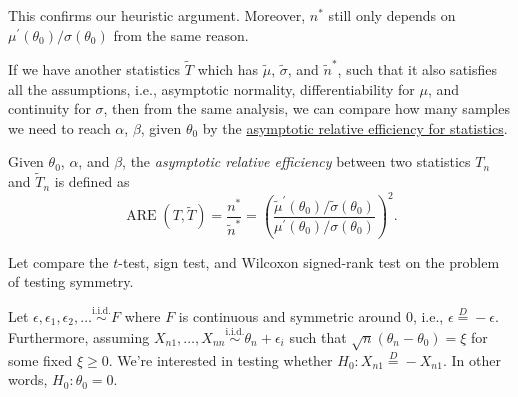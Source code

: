 \begin{remark}
	This confirms our heuristic argument. Moreover, \(n^{\ast} \) still only depends on \(\mu ^{\prime} (\theta _0) / \sigma (\theta _0)\) from the same reason.
\end{remark}

If we have another statistics \(\widetilde{T} \) which has \(\widetilde{\mu} \), \(\widetilde{\sigma} \), and \(\widetilde{n} ^{\ast} \), such that it also satisfies all the assumptions, i.e., asymptotic normality, differentiability for \(\mu \), and continuity for \(\sigma \), then from the same analysis, we can compare how many samples we need to reach \(\alpha \), \(\beta \), given \(\theta _0\) by the \hyperref[def:asymptotic-relative-efficiency-statistics]{asymptotic relative efficiency for statistics}.

\begin{definition}\label{def:asymptotic-relative-efficiency-statistics}
	Given \(\theta _0\), \(\alpha \), and \(\beta \), the \emph{asymptotic relative efficiency} between two statistics \(T_n\) and \(\widetilde{T} _n\) is defined as
	\[
		\operatorname{ARE}(T, \widetilde{T} )
		= \frac{n^{\ast} }{\widetilde{n} ^{\ast} }
		= \left( \frac{\widetilde{\mu} ^{\prime} (\theta _0) / \widetilde{\sigma} (\theta _0)}{\mu ^{\prime} (\theta _0) / \sigma (\theta _0)} \right) ^2.
	\]
\end{definition}

Let compare the \(t\)-test, sign test, and Wilcoxon signed-rank test on the problem of testing symmetry.

\begin{problem*}
	Let \(\epsilon , \epsilon _1, \epsilon _2, \dots \overset{\text{i.i.d.} }{\sim } F\) where \(F\) is continuous and symmetric around \(0\), i.e., \(\epsilon \overset{D}{=} -\epsilon \). Furthermore, assuming \(X_{n1}, \dots , X_{nn} \overset{\text{i.i.d.} }{\sim } \theta _n + \epsilon _i\) such that \(\sqrt{n} (\theta _n - \theta _0) = \xi \) for some fixed \(\xi \geq 0\). We're interested in testing whether \(H_0 \colon X_{n1} \overset{D}{=} -X_{n1}\). In other words, \(H_0 \colon \theta _0 = 0\).
\end{problem*}

